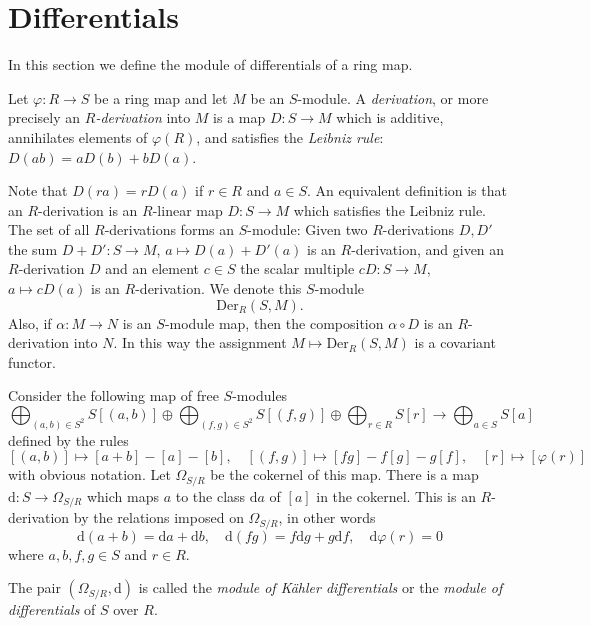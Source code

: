 \section{Differentials}
\label{section-differentials}

\noindent
In this section we define the module of differentials of a ring map.

\begin{definition}
\label{definition-derivation}
Let $\varphi : R \to S$ be a ring map and let $M$ be an $S$-module.
A {\it derivation}, or more precisely an
{\it $R$-derivation} into $M$ is a map $D : S \to M$
which is additive, annihilates elements of $\varphi(R)$,
and satisfies the {\it Leibniz rule}: $D(ab) = aD(b) + bD(a)$.
\end{definition}

\noindent
Note that $D(ra) = rD(a)$ if $r \in R$ and $a \in S$. An equivalent
definition is that an $R$-derivation is an $R$-linear map
$D : S \to M$ which satisfies the Leibniz rule.
The set of all $R$-derivations forms an
$S$-module: Given two $R$-derivations $D, D'$
the sum $D + D' : S \to M$, $a \mapsto D(a)+D'(a)$
is an $R$-derivation, and given an $R$-derivation $D$
and an element $c\in S$ the scalar multiple $cD : S \to M$,
$a \mapsto cD(a)$ is an $R$-derivation. We denote this
$S$-module
$$
\text{Der}_R(S, M).
$$
Also, if $\alpha : M \to N$ is an $S$-module map, then the
composition $\alpha \circ D$ is an $R$-derivation into
$N$. In this way the assignment $M \mapsto \text{Der}_R(S, M)$
is a covariant functor.

\medskip\noindent
Consider the following map of free $S$-modules
$$
\bigoplus\nolimits_{(a, b)\in S^2} S[(a, b)] \oplus
\bigoplus\nolimits_{(f, g)\in S^2} S[(f, g)] \oplus
\bigoplus\nolimits_{r\in R} S[r]
\longrightarrow
\bigoplus\nolimits_{a\in S} S[a]
$$
defined by the rules
$$
[(a, b)] \longmapsto [a + b] - [a] - [b],\quad
[(f, g)] \longmapsto [fg] -f[g] - g[f],\quad
[r]      \longmapsto [\varphi(r)]
$$
with obvious notation. Let $\Omega_{S/R}$ be the cokernel of this map.
There is a map $\text{d} : S \to \Omega_{S/R}$ which maps $a$ to the
class $\text{d}a$ of $[a]$ in the cokernel. This is an $R$-derivation
by the relations imposed on $\Omega_{S/R}$, in other words
$$
\text{d}(a + b) = \text{d}a + \text{d}b, \quad
\text{d}(fg) = f\text{d}g + g\text{d}f, \quad
\text{d}\varphi(r) = 0
$$
where $a,b,f,g \in S$ and $r \in R$.

\begin{definition}
\label{definition-differentials}
The pair $(\Omega_{S/R}, \text{d})$ is called the {\it module
of K\"ahler differentials} or the {\it module of differentials}
of $S$ over $R$.
\end{definition}

